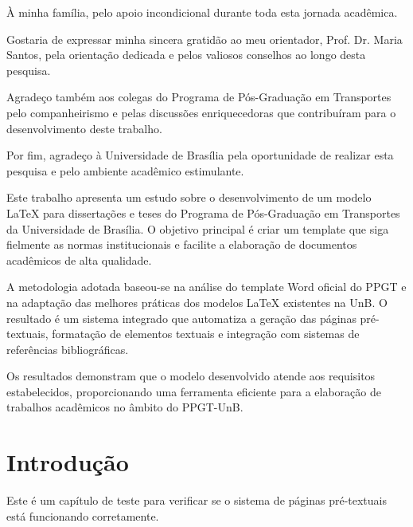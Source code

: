 \documentclass[mestrado,onehalfspacing,impressao]{UnB-PPGT}
\begin{document}

\begin{dedicatoria}
À minha família, pelo apoio incondicional durante toda esta jornada acadêmica.
\end{dedicatoria}

\begin{agradecimentos}
Gostaria de expressar minha sincera gratidão ao meu orientador, Prof. Dr. Maria Santos, pela orientação dedicada e pelos valiosos conselhos ao longo desta pesquisa.

Agradeço também aos colegas do Programa de Pós-Graduação em Transportes pelo companheirismo e pelas discussões enriquecedoras que contribuíram para o desenvolvimento deste trabalho.

Por fim, agradeço à Universidade de Brasília pela oportunidade de realizar esta pesquisa e pelo ambiente acadêmico estimulante.
\end{agradecimentos}

\begin{resumo}
Este trabalho apresenta um estudo sobre o desenvolvimento de um modelo LaTeX para dissertações e teses do Programa de Pós-Graduação em Transportes da Universidade de Brasília. O objetivo principal é criar um template que siga fielmente as normas institucionais e facilite a elaboração de documentos acadêmicos de alta qualidade.

A metodologia adotada baseou-se na análise do template Word oficial do PPGT e na adaptação das melhores práticas dos modelos LaTeX existentes na UnB. O resultado é um sistema integrado que automatiza a geração das páginas pré-textuais, formatação de elementos textuais e integração com sistemas de referências bibliográficas.

Os resultados demonstram que o modelo desenvolvido atende aos requisitos estabelecidos, proporcionando uma ferramenta eficiente para a elaboração de trabalhos acadêmicos no âmbito do PPGT-UnB.
\end{resumo}

\begin{abstract}
This work presents a study on the development of a LaTeX template for dissertations and theses of the Graduate Program in Transportation at the University of Brasília. The main objective is to create a template that faithfully follows institutional standards and facilitates the preparation of high-quality academic documents.

The methodology adopted was based on the analysis of the official Word template of PPGT and the adaptation of best practices from existing LaTeX models at UnB. The result is an integrated system that automates the generation of pre-textual pages, formatting of textual elements and integration with bibliographic reference systems.

The results demonstrate that the developed model meets the established requirements, providing an efficient tool for the preparation of academic works within the scope of PPGT-UnB.
\end{abstract}

\chapter{Introdução}

Este é um capítulo de teste para verificar se o sistema de páginas pré-textuais está funcionando corretamente.
\end{document}
